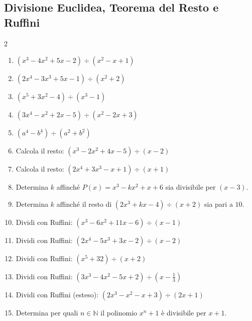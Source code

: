 \subsection{Divisione Euclidea, Teorema del Resto e Ruffini}
\begin{multicols}{2}
\begin{enumerate}
    \item {} $(x^3 - 4x^2 + 5x - 2) \div (x^2 - x + 1)$
    \item {} $(2x^4 - 3x^3 + 5x - 1) \div (x^2 + 2)$
    \item {} $(x^5 + 3x^2 - 4) \div (x^3 - 1)$
    \item {} $(3x^4 - x^2 + 2x - 5) \div (x^2 - 2x + 3)$
    \item {} $(a^4 - b^4) \div (a^2 + b^2)$
    \item {} Calcola il resto: $(x^3 - 2x^2 + 4x - 5) \div (x - 2)$
    \item {} Calcola il resto: $(2x^4 + 3x^3 - x + 1) \div (x + 1)$
    \item {} Determina $k$ affinché $P(x) = x^3 - kx^2 + x + 6$ sia divisibile per $(x - 3)$.
    \item {} Determina $k$ affinché il resto di $(2x^3 + kx - 4) \div (x + 2)$ sia pari a $10$.
    \item {} Dividi con Ruffini: $(x^3 - 6x^2 + 11x - 6) \div (x - 1)$
    \item {} Dividi con Ruffini: $(2x^4 - 5x^3 + 3x - 2) \div (x - 2)$
    \item {} Dividi con Ruffini: $(x^5 + 32) \div (x + 2)$
    \item {} Dividi con Ruffini: $(3x^3 - 4x^2 - 5x + 2) \div \left(x - \frac{1}{3}\right)$
    \item {} Dividi con Ruffini (esteso): $(2x^3 - x^2 - x + 3) \div (2x + 1)$
    \item {} Determina per quali $n \in \mathbb{N}$ il polinomio $x^n + 1$ è divisibile per $x+1$.
\end{enumerate}
\end{multicols}

